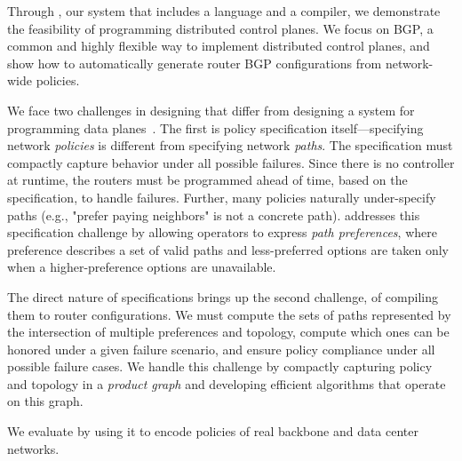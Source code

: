 Through \sysname, our system that includes a language and a compiler, we demonstrate the feasibility of programming distributed control planes. We focus on BGP, a common and highly flexible way to implement distributed control planes, and show how to automatically generate router BGP configurations from network-wide policies.

We face two challenges in designing \sysname that differ from designing a system for programming data planes~\cite{x,y,z}. The first is policy specification itself---specifying network {\em policies} is different from specifying network {\em paths}.
%
The specification must compactly capture behavior under all possible failures. Since there is no controller at runtime, the routers must be programmed ahead of time, based on the specification, to handle failures.
%
Further, many policies naturally under-specify paths (e.g., "prefer paying neighbors" is not a concrete path). 
%
\sysname addresses this specification challenge by allowing operators to express {\em path preferences}, where preference describes a set of valid paths and less-preferred options are taken only when a higher-preference options are unavailable.

The direct nature of \sysname specifications brings up the second challenge, of compiling them to router configurations.  We must compute the sets of paths represented by the intersection of multiple preferences and topology, compute which ones can be honored under a given failure scenario, and ensure policy compliance under all possible failure cases. We handle this challenge by compactly capturing policy and topology in a {\em product graph} and developing efficient algorithms that operate on this graph. 

We evaluate \sysname by using it to encode policies of real backbone and data center networks. 



